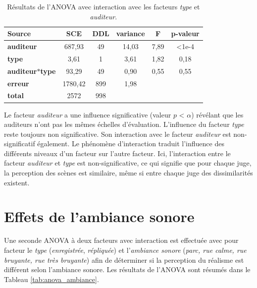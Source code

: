 \begin{table}[ht]
\caption{Résultats de l'ANOVA avec interaction avec les facteurs \textit{type} et \textit{auditeur}.}
\centering
\begin{tabular}{lccccc}
\hline
\textbf{Source}     & \textbf{SCE} & \textbf{DDL} & \textbf{variance} & \textbf{F} & \textbf{p-valeur} \\
\hline
\textbf{auditeur} & 687,93 & 49 & 14,03 & 7,89 & <1e-4 \\
\hline
\textbf{type} & 3,61 & 1 & 3,61 & 1,82 & 0,18 \\
\hline
\textbf{auditeur$*$type} & 93,29 & 49 & 0,90 & 0,55 & 0,55 \\
\hline
\textbf{erreur}      & 1780,42 & 899 & 1,98 & &  \\
\hline
\textbf{total}      & 2572 & 998 & & & \\
\hline
\end{tabular}
\label{tab:anova_auditeur}
\end{table}

Le facteur \textit{auditeur} a une influence significative (valeur $p$ < $\alpha$) révélant que les auditeurs n'ont pas les mêmes échelles d'évaluation. L'influence du facteur \textit{type} reste toujours non significative. Son interaction avec le facteur \textit{auditeur} est non-significatif également.
Le phénomène d'interaction traduit l'influence des différents niveaux d'un facteur sur l'autre facteur. Ici, l'interaction entre le facteur \textit{auditeur} et \textit{type} est non-significative, ce qui signifie que pour chaque juge, la perception des scènes est similaire, même si entre chaque juge des dissimilarités existent.

\section{Effets de l'ambiance sonore}

Une seconde ANOVA à deux facteurs avec interaction est effectuée avec pour facteur le \textit{type} (\textit{enregistrée}, \textit{répliquée}) et l'\textit{ambiance sonore} (\textit{parc, rue calme, rue bruyante, rue très bruyante}) afin de déterminer si la perception du réalisme est différent selon l'ambiance sonore. Les résultats de l'ANOVA sont résumés dans le Tableau \ref{tab:anova_ambiance}.

